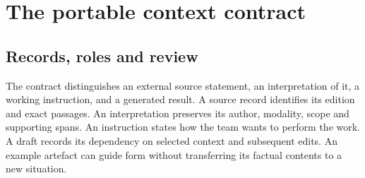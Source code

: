 \documentclass[
  11pt,
]{article}
\let\originalsection\section
\renewcommand{\section}{\Needspace{5\baselineskip}\originalsection}
\begin{document}
\section{The portable context
contract}\label{the-portable-context-contract}

\subsection{Records, roles and review}\label{records-roles-and-review}

The contract distinguishes an external source statement, an
interpretation of it, a working instruction, and a generated result. A
source record identifies its edition and exact passages. An
interpretation preserves its author, modality, scope and supporting
spans. An instruction states how the team wants to perform the work. A
draft records its dependency on selected context and subsequent edits.
An example artefact can guide form without transferring its factual
contents to a new situation.

\end{document}
